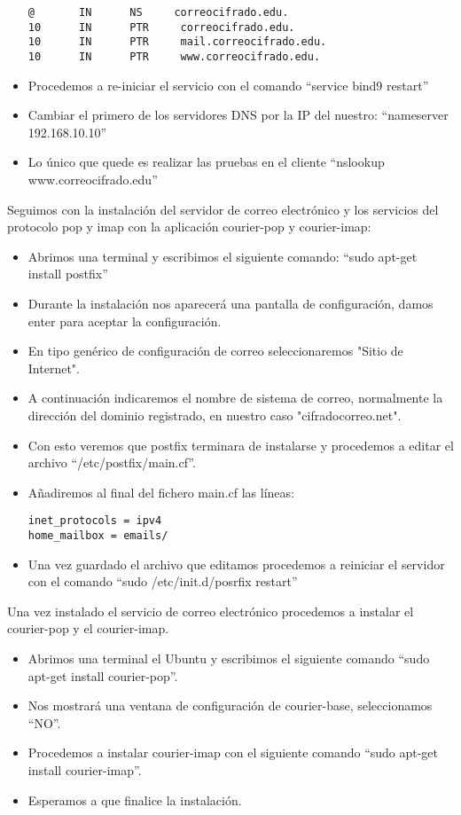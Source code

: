 \documentclass[12pt,oneside,onecolumn,openany]{report}
\begin{document}
\begin{itemize}
\begin{lstlisting}[frame=single]
@       IN      NS     correocifrado.edu.
10      IN      PTR     correocifrado.edu.
10      IN      PTR     mail.correocifrado.edu.
10      IN      PTR     www.correocifrado.edu.
  \end{lstlisting}
  \item Procedemos a re-iniciar el servicio con el comando “service bind9 restart”
  \item Cambiar el primero de los servidores DNS por la IP del nuestro: “nameserver 192.168.10.10”
  \item Lo único que quede es realizar las pruebas en el cliente “nslookup www.correocifrado.edu”
\end{itemize}
Seguimos con la instalación del servidor de correo electrónico y los servicios del protocolo pop y imap con la aplicación courier-pop y courier-imap:
\begin{itemize}
 \item Abrimos una terminal y escribimos el siguiente comando: “sudo apt-get install postfix”
 \item Durante la instalación nos aparecerá una pantalla de configuración, damos enter para aceptar la configuración.
 \item En tipo genérico de configuración de correo seleccionaremos "Sitio de Internet".
 \item A continuación indicaremos el nombre de sistema de correo, normalmente la dirección del dominio registrado, en nuestro caso "cifradocorreo.net".
 \item Con esto veremos que postfix terminara de instalarse y procedemos a editar el archivo “/etc/postfix/main.cf”.
 \item Añadiremos al final del fichero main.cf las líneas:
 \begin{lstlisting}[frame=single]
  inet_protocols = ipv4
home_mailbox = emails/
 \end{lstlisting}
 \item Una vez guardado el archivo que editamos procedemos a reiniciar el servidor con el comando “sudo /etc/init.d/posrfix restart”
\end{itemize}


Una vez instalado el servicio de correo electrónico procedemos a instalar el courier-pop y el courier-imap.
\begin{itemize}
 \item Abrimos una terminal el Ubuntu y escribimos el siguiente comando “sudo apt-get install courier-pop”.
 \item Nos mostrará una ventana de configuración de courier-base, seleccionamos “NO”.
 \item Procedemos a instalar courier-imap con el siguiente comando “sudo apt-get install courier-imap”.
 \item Esperamos a que finalice la instalación.
\end{itemize}
\end{document}
